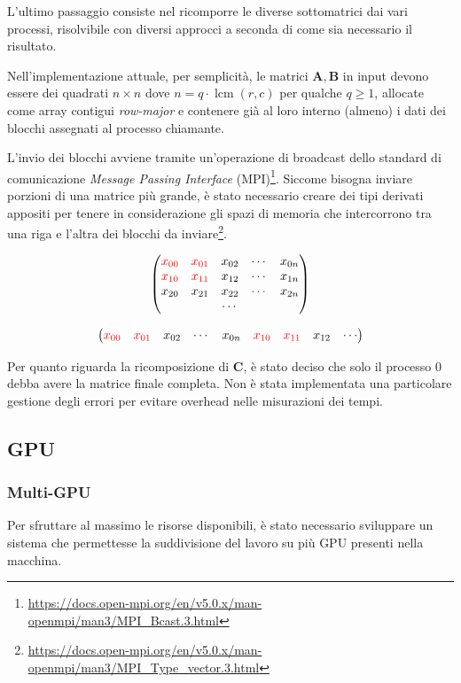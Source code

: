 \documentclass[a4paper]{article}
\DeclareMathOperator{\lcm}{lcm}
\begin{document}
L'ultimo passaggio consiste nel ricomporre le diverse sottomatrici dai vari processi, risolvibile con diversi approcci a seconda di come sia necessario il risultato.

\medskip Nell'implementazione attuale, per semplicità, le matrici $\mathbf{A}, \mathbf{B}$ in input devono essere dei quadrati $n \times n$ dove $n = q \cdot \lcm(r,c)$ per qualche $q \ge 1$, allocate come array contigui \textit{row-major} e contenere già al loro interno (almeno) i dati dei blocchi assegnati al processo chiamante.

L'invio dei blocchi avviene tramite un'operazione di broadcast dello standard di comunicazione \textit{Message Passing Interface} (MPI)\footnote{\url{https://docs.open-mpi.org/en/v5.0.x/man-openmpi/man3/MPI_Bcast.3.html}}.
Siccome bisogna inviare porzioni di una matrice più grande, è stato necessario creare dei tipi derivati appositi per tenere in considerazione gli spazi di memoria che intercorrono tra una riga e l'altra dei blocchi da inviare\footnote{\url{https://docs.open-mpi.org/en/v5.0.x/man-openmpi/man3/MPI_Type_vector.3.html}}.

$$
    \begin{pmatrix}
        \color{red} x_{00} & \color{red} x_{01} & x_{02} & \cdots & x_{0n} \\
        \color{red} x_{10} & \color{red} x_{11} & x_{12} & \cdots & x_{1n} \\
        x_{20}             & x_{21}             & x_{22} & \cdots & x_{2n} \\
                           &                    & \cdots &        &        \\
    \end{pmatrix}
$$

$$
    \begin{pmatrix}
        \color{red} x_{00} & \color{red} x_{01} & x_{02} & \cdots & x_{0n} & \color{red} x_{10} & \color{red} x_{11} & x_{12} & \cdots
    \end{pmatrix}
$$

Per quanto riguarda la ricomposizione di $\mathbf{C}$, è stato deciso che solo il processo 0 debba avere la matrice finale completa.
Non è stata implementata una particolare gestione degli errori per evitare overhead nelle misurazioni dei tempi.

\subsection{GPU}
\subsubsection{Multi-GPU}
Per sfruttare al massimo le risorse disponibili, è stato necessario sviluppare un sistema che permettesse la suddivisione del lavoro su più GPU presenti nella macchina.
\end{document}
